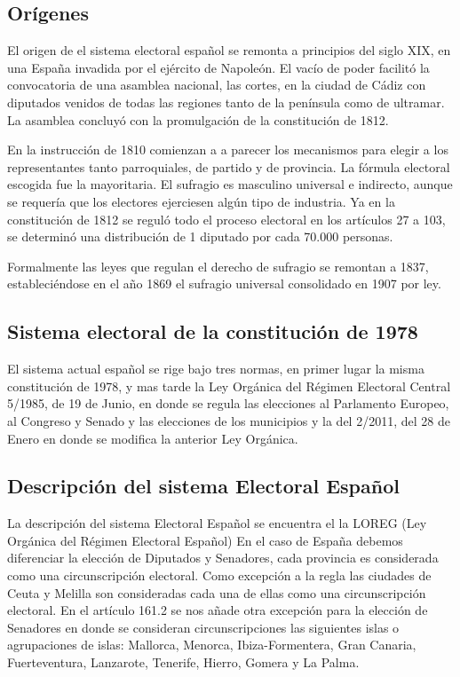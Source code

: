 \documentclass[12pt,a4paper,]{book}
\numberwithin{dummy}{section}
\theoremstyle{ocrenumbox}
\theoremstyle{blacknumex}
\theoremstyle{blacknumbox}
\theoremstyle{ocrenum}
\theoremstyle{ocrenum}
\begin{document}
\hypertarget{oruxedgenes}{%
\subsection{Orígenes}\label{oruxedgenes}}

El origen de el sistema electoral español se remonta a principios del
siglo XIX, en una España invadida por el ejército de Napoleón. El vacío
de poder facilitó la convocatoria de una asamblea nacional, las cortes,
en la ciudad de Cádiz con diputados venidos de todas las regiones tanto
de la península como de ultramar. La asamblea concluyó con la
promulgación de la constitución de 1812.

En la instrucción de 1810 comienzan a a parecer los mecanismos para
elegir a los representantes tanto parroquiales, de partido y de
provincia. La fórmula electoral escogida fue la mayoritaria. El sufragio
es masculino universal e indirecto, aunque se requería que los electores
ejerciesen algún tipo de industria. Ya en la constitución de 1812 se
reguló todo el proceso electoral en los artículos 27 a 103, se determinó
una distribución de 1 diputado por cada 70.000 personas.

Formalmente las leyes que regulan el derecho de sufragio se remontan a
1837, estableciéndose en el año 1869 el sufragio universal consolidado
en 1907 por ley.

\hypertarget{sistema-electoral-de-la-constituciuxf3n-de-1978}{%
\subsection{Sistema electoral de la constitución de
1978}\label{sistema-electoral-de-la-constituciuxf3n-de-1978}}

El sistema actual español se rige bajo tres normas, en primer lugar la
misma constitución de 1978, y mas tarde la Ley Orgánica del Régimen
Electoral Central 5/1985, de 19 de Junio, en donde se regula las
elecciones al Parlamento Europeo, al Congreso y Senado y las elecciones
de los municipios y la del 2/2011, del 28 de Enero en donde se modifica
la anterior Ley Orgánica.

\hypertarget{descripciuxf3n-del-sistema-electoral-espauxf1ol}{%
\subsection{Descripción del sistema Electoral
Español}\label{descripciuxf3n-del-sistema-electoral-espauxf1ol}}

La descripción del sistema Electoral Español se encuentra el la LOREG
(Ley Orgánica del Régimen Electoral Español) En el caso de España
debemos diferenciar la elección de Diputados y Senadores, cada provincia
es considerada como una circunscripción electoral. Como excepción a la
regla las ciudades de Ceuta y Melilla son consideradas cada una de ellas
como una circunscripción electoral. En el artículo 161.2 se nos añade
otra excepción para la elección de Senadores en donde se consideran
circunscripciones las siguientes islas o agrupaciones de islas:
Mallorca, Menorca, Ibiza-Formentera, Gran Canaria, Fuerteventura,
Lanzarote, Tenerife, Hierro, Gomera y La Palma.
\end{document}

